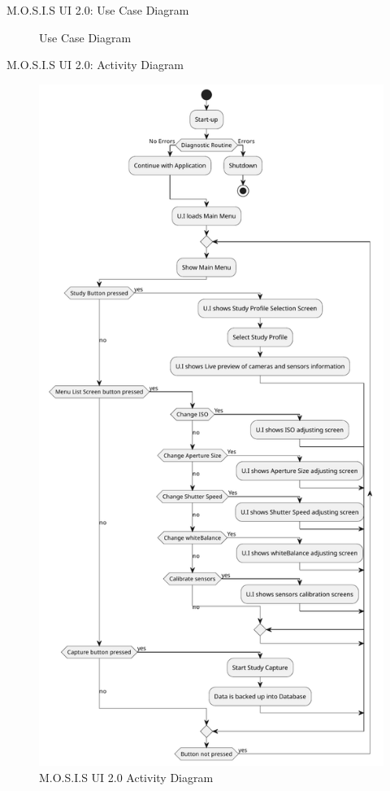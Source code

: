 \documentclass[14pt, aspectratio=169]{beamer}
\begin{document}
\begin{frame}{M.O.S.I.S UI 2.0: Use Case Diagram}

	\begin{figure}
		\caption{Use Case Diagram}
	\end{figure}
\end{frame}
\begin{frame}{M.O.S.I.S UI 2.0: Activity Diagram}
	\begin{figure}[H]
		\includegraphics[page=1,height=0.7\textheight]{../../Progress_Report_Document/Appendix/Design_Documentation/Activity_Diagram/Figures/activity.pdf}
		\caption{M.O.S.I.S UI 2.0 Activity Diagram}
	\end{figure}

\end{frame}
\end{document}
